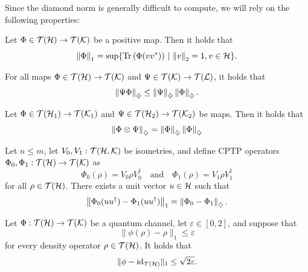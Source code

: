 Since the diamond norm is generally difficult to compute, we will rely on the following properties:


\begin{theorem} \label{thm:russo_dye}
Let \(\Phi \in \mathcal{T}(\mathcal{H}) \to \mathcal{T}(\mathcal{K})\) be a positive map. Then it holds that
\[
\left\lVert \Phi \right\rVert_{1}= \sup \{ \operatorname{Tr} \left( \Phi(vv^*) \right) \, \vert \, \left\lVert v \right\rVert_{2}=1, v\in \mathcal{H}  \}.
\]
\end{theorem}

\begin{proposition} \cite[Proposition 3.48]{watrous2018theory} \label{prop:diamond_submult}
  For all maps \(\Phi \in \mathcal{T}(\mathcal{H}) \to \mathcal{T}(\mathcal{K})\) and \(\Psi \in \mathcal{T}(\mathcal{K}) \to \mathcal{T}(\mathcal{L})\), it holds that
  \begin{align*}
    \left\lVert \Psi \Phi \right\rVert_{\diamondsuit} \leq  \left\lVert \Psi \right\rVert_{\diamondsuit} \left\lVert \Phi \right\rVert_{\diamondsuit}. 
  \end{align*}
\end{proposition}

\begin{theorem} \cite[Theorem 3.49]{watrous2018theory}\label{thm:diamond_tensor_comp}
  Let $\Phi \in \mathcal{T}(\mathcal{H}_1) \to \mathcal{T}(\mathcal{K}_1)$ and \(\Psi \in \mathcal{T}(\mathcal{H}_2) \to \mathcal{T}(\mathcal{K}_2)\) be maps. Then it holds that
\[
\left\lVert \Phi \otimes \Psi \right\rVert_{\diamondsuit} = \left\lVert \Phi \right\rVert_{\diamondsuit}\left\lVert \Phi \right\rVert_{\diamondsuit}
\]
\end{theorem}

\begin{theorem} \cite[Theorem 3.55]{watrous2018theory} \label{theorem:diamond_iso}
  Let  $ n \leq m$, let $V_0,V_1: \mathcal{T}(\mathcal{H},\mathcal{K})$ be isometries, and define CPTP operators $\Phi_0,\Phi_1:\mathcal{T}(\mathcal{H}) \to \mathcal{T}(\mathcal{K})$ as
\[
\Phi_0(\rho) = V_0 \rho V_0^\dag \quad \text{and} \quad \Phi_1(\rho) = V_1 \rho V_1^\dag
\]
for all $\rho \in \mathcal{T}(\mathcal{H})$. There exists a unit vector $u \in \mathcal{H} $ such that
\[
\left\lVert \Phi_0(uu^\dag) - \Phi_1(uu^\dag) \right\rVert_{1} = \left\lVert \Phi_0 - \Phi_1 \right\rVert_{\diamondsuit}.
\]
\end{theorem}

\begin{theorem} \cite[Theorem 3.56]{watrous2018theory} \label{theorem:diamond_cptp_id}
 Let $\Phi:\mathcal{T}(\mathcal{H}) \to \mathcal{T}(\mathcal{K}) $ be a quantum channel, let $\varepsilon \in [0,2]$, and suppose that
    \[
    \|\phi(\rho) - \rho\|_1 \leq \varepsilon
    \]
    for every density operator $\rho \in \mathcal{T}(\mathcal{H})$. It holds that
    \[
    \|\phi - \mathrm{id}_{\mathcal{T}(\mathcal{H})}\|_1 \leq \sqrt{2\varepsilon}.
    \]
\end{theorem}





